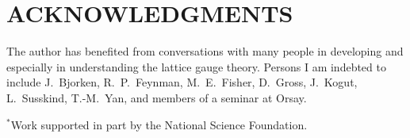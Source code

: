\section*{ACKNOWLEDGMENTS}\label{sec:ack}

The author has benefited from conversations with many people in
developing and especially in understanding the lattice gauge theory.
Persons I am indebted to include J.~Bjorken, R.~P.~Feynman, M.~E.~Fisher,
D.~Gross, J.~Kogut, L.~Susskind, T.-M.~Yan, and members of a seminar at
Orsay.

\vspace{4mm}

\begin{center}
\footnotesize
\begin{minipage}{0.93\textwidth}
\raggedright
${}^{*}$Work supported in part by the National Science Foundation.


\end{minipage}
\end{center}
